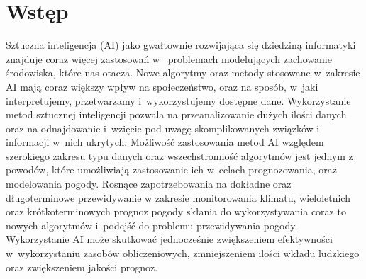



\section{Wstęp}

Sztuczna inteligencja (AI) jako gwałtownie rozwijająca się 
dziedziną informatyki znajduje coraz więcej zastosowań w~
problemach modelujących zachowanie środowiska, które nas otacza. 
Nowe algorytmy oraz metody stosowane w~zakresie AI mają coraz
większy wpływ na społeczeństwo, oraz na sposób, w~jaki interpretujemy,
przetwarzamy i~wykorzystujemy dostępne dane. Wykorzystanie metod
sztucznej inteligencji pozwala na przeanalizowanie dużych ilości
danych oraz na odnajdowanie i~wzięcie pod uwagę skomplikowanych związków
i informacji w~nich ukrytych. Możliwość zastosowania metod AI względem 
szerokiego zakresu typu danych oraz wszechstronność algorytmów jest jednym z~
powodów, które umożliwiają zastosowanie ich w~celach prognozowania, oraz modelowania
pogody. Rosnące zapotrzebowania na dokładne oraz długoterminowe przewidywanie
w zakresie monitorowania klimatu, wieloletnich oraz krótkoterminowych prognoz
pogody skłania do wykorzystywania coraz to nowych algorytmów i~podejść
do problemu przewidywania pogody. Wykorzystanie AI może skutkować jednocześnie 
zwiększeniem efektywności w~wykorzystaniu zasobów obliczeniowych, zmniejszeniem
ilości wkładu ludzkiego oraz zwiększeniem jakości prognoz.

